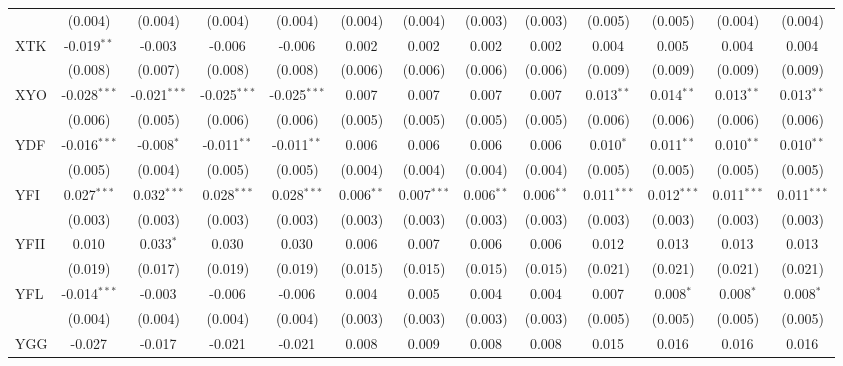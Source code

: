 \begin{table}[!htbp]
\begin{tabular}{@{\extracolsep{5pt}}lcccccccccccc}
  & (0.004) & (0.004) & (0.004) & (0.004) & (0.004) & (0.004) & (0.003) & (0.003) & (0.005) & (0.005) & (0.004) & (0.004) \\
 XTK & -0.019$^{**}$ & -0.003$^{}$ & -0.006$^{}$ & -0.006$^{}$ & 0.002$^{}$ & 0.002$^{}$ & 0.002$^{}$ & 0.002$^{}$ & 0.004$^{}$ & 0.005$^{}$ & 0.004$^{}$ & 0.004$^{}$ \\
  & (0.008) & (0.007) & (0.008) & (0.008) & (0.006) & (0.006) & (0.006) & (0.006) & (0.009) & (0.009) & (0.009) & (0.009) \\
 XYO & -0.028$^{***}$ & -0.021$^{***}$ & -0.025$^{***}$ & -0.025$^{***}$ & 0.007$^{}$ & 0.007$^{}$ & 0.007$^{}$ & 0.007$^{}$ & 0.013$^{**}$ & 0.014$^{**}$ & 0.013$^{**}$ & 0.013$^{**}$ \\
  & (0.006) & (0.005) & (0.006) & (0.006) & (0.005) & (0.005) & (0.005) & (0.005) & (0.006) & (0.006) & (0.006) & (0.006) \\
 YDF & -0.016$^{***}$ & -0.008$^{*}$ & -0.011$^{**}$ & -0.011$^{**}$ & 0.006$^{}$ & 0.006$^{}$ & 0.006$^{}$ & 0.006$^{}$ & 0.010$^{*}$ & 0.011$^{**}$ & 0.010$^{**}$ & 0.010$^{**}$ \\
  & (0.005) & (0.004) & (0.005) & (0.005) & (0.004) & (0.004) & (0.004) & (0.004) & (0.005) & (0.005) & (0.005) & (0.005) \\
 YFI & 0.027$^{***}$ & 0.032$^{***}$ & 0.028$^{***}$ & 0.028$^{***}$ & 0.006$^{**}$ & 0.007$^{***}$ & 0.006$^{**}$ & 0.006$^{**}$ & 0.011$^{***}$ & 0.012$^{***}$ & 0.011$^{***}$ & 0.011$^{***}$ \\
  & (0.003) & (0.003) & (0.003) & (0.003) & (0.003) & (0.003) & (0.003) & (0.003) & (0.003) & (0.003) & (0.003) & (0.003) \\
 YFII & 0.010$^{}$ & 0.033$^{*}$ & 0.030$^{}$ & 0.030$^{}$ & 0.006$^{}$ & 0.007$^{}$ & 0.006$^{}$ & 0.006$^{}$ & 0.012$^{}$ & 0.013$^{}$ & 0.013$^{}$ & 0.013$^{}$ \\
  & (0.019) & (0.017) & (0.019) & (0.019) & (0.015) & (0.015) & (0.015) & (0.015) & (0.021) & (0.021) & (0.021) & (0.021) \\
 YFL & -0.014$^{***}$ & -0.003$^{}$ & -0.006$^{}$ & -0.006$^{}$ & 0.004$^{}$ & 0.005$^{}$ & 0.004$^{}$ & 0.004$^{}$ & 0.007$^{}$ & 0.008$^{*}$ & 0.008$^{*}$ & 0.008$^{*}$ \\
  & (0.004) & (0.004) & (0.004) & (0.004) & (0.003) & (0.003) & (0.003) & (0.003) & (0.005) & (0.005) & (0.005) & (0.005) \\
 YGG & -0.027$^{}$ & -0.017$^{}$ & -0.021$^{}$ & -0.021$^{}$ & 0.008$^{}$ & 0.009$^{}$ & 0.008$^{}$ & 0.008$^{}$ & 0.015$^{}$ & 0.016$^{}$ & 0.016$^{}$ & 0.016$^{}$ \\

\end{tabular}
\end{table}
